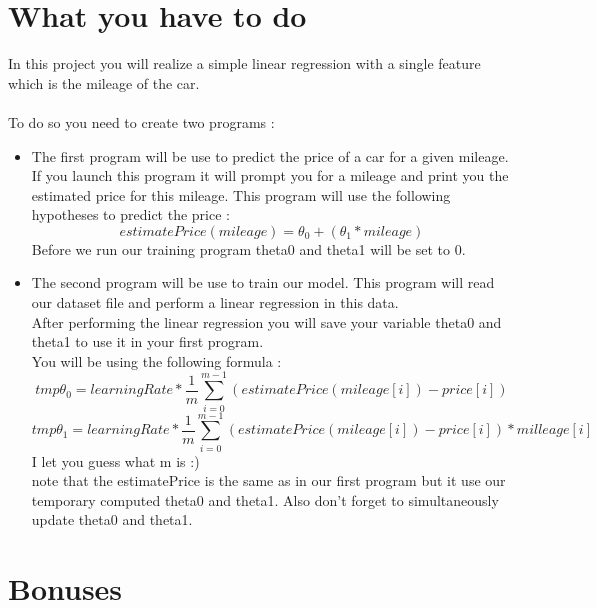 \documentclass{42}
\begin{document}
\chapter{What you have to do}
	
	In this project you will realize a simple linear regression with a single feature which is the mileage of the car.\\\\

	To do so you need to create two programs :\\
	\vspace{5mm}
	\begin{itemize}\itemsep6pt
		\item The first program will be use to predict the price of a car for a given mileage. If you launch this program it will prompt you for a mileage and print you the estimated price for this mileage. This program will use the following hypotheses to predict the price :
		\[
		estimatePrice (mileage) = \theta_{0} + ( \theta_{1} * mileage )
		\]
		Before we run our training program theta0 and theta1 will be set to 0.
		\item The second program will be use to train our model. This program will read our dataset file and perform a linear regression in this data.\\
		After performing the linear regression you will save your variable theta0 and theta1 to use it in your first program.\\
		You will be using the following formula :
		\[
		tmp\theta_{0} = learningRate * \frac{1}{m} \sum_{i=0}^{m-1} (estimatePrice(mileage[i]) - price[i])
		\]
		\[
		tmp\theta_{1} = learningRate * \frac{1}{m} \sum_{i=0}^{m-1} (estimatePrice(mileage[i]) - price[i]) * milleage[i]
		\]
		I let you guess what m is :)\\
		note that the estimatePrice is the same as in our first program but it use our temporary computed theta0 and theta1.
		Also don't forget to simultaneously update theta0 and theta1.
	\end{itemize}

\chapter{Bonuses}
\end{document}
